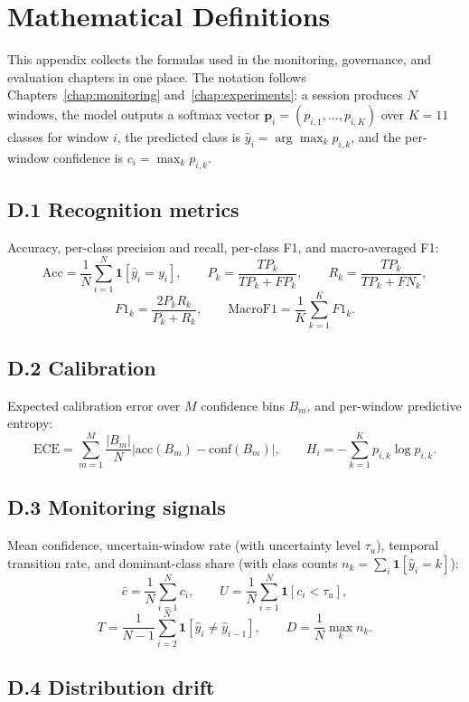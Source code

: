\chapter{Mathematical Definitions}
\label{app:math}

This appendix collects the formulas used in the monitoring, governance, and evaluation chapters in one place. The notation follows Chapters~\ref{chap:monitoring} and~\ref{chap:experiments}: a session produces \(N\) windows, the model outputs a softmax vector \(\mathbf{p}_i=(p_{i,1},\dots,p_{i,K})\) over \(K=11\) classes for window \(i\), the predicted class is \(\hat{y}_i=\arg\max_k p_{i,k}\), and the per-window confidence is \(c_i=\max_k p_{i,k}\).

\section*{D.1 Recognition metrics}

\noindent Accuracy, per-class precision and recall, per-class F1, and macro-averaged F1:
\[
\mathrm{Acc}=\frac{1}{N}\sum_{i=1}^{N}\mathbf{1}\!\left[\hat{y}_i=y_i\right],
\qquad
P_k=\frac{TP_k}{TP_k+FP_k},
\qquad
R_k=\frac{TP_k}{TP_k+FN_k},
\]
\[
F1_k=\frac{2P_kR_k}{P_k+R_k},
\qquad
\mathrm{MacroF1}=\frac{1}{K}\sum_{k=1}^{K}F1_k.
\]

\section*{D.2 Calibration}

\noindent Expected calibration error over \(M\) confidence bins \(B_m\), and per-window predictive entropy:
\[
\mathrm{ECE}=\sum_{m=1}^{M}\frac{|B_m|}{N}\left|\mathrm{acc}(B_m)-\mathrm{conf}(B_m)\right|,
\qquad
H_i=-\sum_{k=1}^{K}p_{i,k}\log p_{i,k}.
\]

\section*{D.3 Monitoring signals}

\noindent Mean confidence, uncertain-window rate (with uncertainty level \(\tau_u\)), temporal transition rate, and dominant-class share (with class counts \(n_k=\sum_i\mathbf{1}[\hat{y}_i=k]\)):
\[
\bar{c}=\frac{1}{N}\sum_{i=1}^{N}c_i,
\qquad
U=\frac{1}{N}\sum_{i=1}^{N}\mathbf{1}\!\left[c_i<\tau_u\right],
\]
\[
T=\frac{1}{N-1}\sum_{i=2}^{N}\mathbf{1}\!\left[\hat{y}_i\neq\hat{y}_{i-1}\right],
\qquad
D=\frac{1}{N}\max_{k}n_k.
\]

\section*{D.4 Distribution drift}

